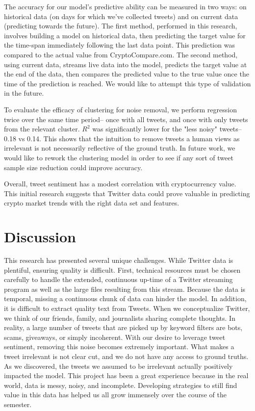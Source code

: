 \documentclass[sigconf]{acmart}
\begin{document}
The accuracy for our model's predictive ability can be measured in two ways: on historical data (on days for which we've collected tweets) and on current data (predicting towards the future). The first method, performed in this research, involves building a model on historical data, then predicting the target value for the time-span immediately following the last data point. This prediction was compared to the actual value from CryptoCompare.com. The second method, using current data, streams live data into the model, predicts the target value at the end of the data, then compares the predicted value to the true value once the time of the prediction is reached. We would like to attempt this type of validation in the future.

To evaluate the efficacy of clustering for noise removal, we perform regression twice over the same time period-- once with all tweets, and once with only tweets from the relevant cluster. $R^2$ was significantly lower for the "less noisy" tweets-- 0.18 vs 0.14. This shows that the intuition to remove tweets a human views as irrelevant is not necessarily reflective of the ground truth. In future work, we would like to rework the clustering model in order to see if any sort of tweet sample size reduction could improve accuracy.

Overall, tweet sentiment has a modest correlation with cryptocurrency value. This initial research suggests that Twitter data could prove valuable in predicting crypto market trends with the right data set and features.

\section{Discussion}
This research has presented several unique challenges. While Twitter data is plentiful, ensuring quality is difficult. First, technical resources must be chosen carefully to handle the extended, continuous up-time of a Twitter streaming program as well as the large files resulting from this stream. Because the data is temporal, missing a continuous chunk of data can hinder the model. In addition, it is difficult to extract quality text from Tweets. When we conceptualize Twitter, we think of our friends, family, and journalists sharing complete thoughts. In reality, a large number of tweets that are picked up by keyword filters are bots, scams, giveaways, or simply incoherent. With our desire to leverage tweet sentiment, removing this noise becomes extremely important. What makes a tweet irrelevant is not clear cut, and we do not have any access to ground truths. As we discovered, the tweets we assumed to be irrelevant actually positively impacted the model. This project has been a great experience because in the real world, data is messy, noisy, and incomplete. Developing strategies to still find value in this data has helped us all grow immensely over the course of the semester.



\end{document}
